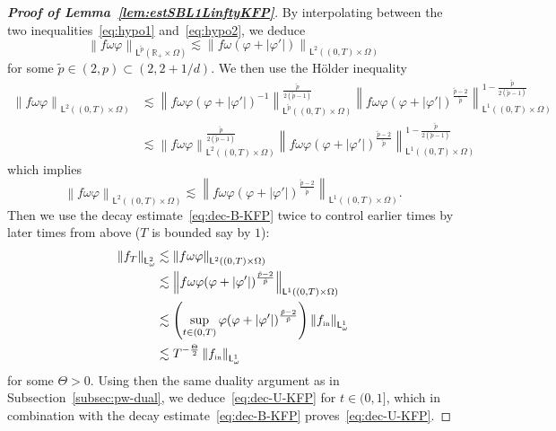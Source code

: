\documentclass[11pt]{amsart}
\theoremstyle{definition}
\theoremstyle{remark}
\numberwithin{equation}{section}
\newcommand\R{{\mathbb R}}
\newcommand{\init}{\text{{\tiny {\rm in}}}}
\newcommand{\sfL}{\mathsf{L}}
\begin{document}
\begin{proof}[{\bf Proof of Lemma~\ref{lem:estSBL1LinftyKFP}}]
By interpolating between the two inequalities~\eqref{eq:hypo1} and~\eqref{eq:hypo2}, we deduce
\begin{equation}
  \label{eq:hypo3}
  \left\| f \omega \varphi \right\|_{\sfL^{\tilde p}(\R_+ \times \Omega)}  \lesssim
  \left\| f \omega (\varphi + |\varphi'|) \right\|_{\sfL^2((0,T) \times \Omega)}
\end{equation}
for some $\tilde p \in (2,p) \subset (2,2+1/d)$. We then use the Hölder inequality
\begin{align*}
  \left\| f \omega \varphi \right\|_{\sfL^2((0,T) \times \Omega)}
  & \lesssim \left\| f \omega \varphi (\varphi + |\varphi'|)^{-1} \right\|_{\sfL^{\tilde p}((0,T) \times \Omega)} ^{\frac{\tilde p}{2(\tilde p-1)}}  \left\| f \omega \varphi (\varphi + |\varphi'|)^{\frac{\tilde p-2}{\tilde p}} \right\|_{\sfL^1((0,T) \times \Omega)} ^{1-\frac{\tilde p}{2(\tilde p-1)}} \\
  & \lesssim \left\| f \omega \varphi \right\|_{\sfL^2((0,T) \times \Omega)} ^{\frac{\tilde p}{2(\tilde p-1)}}  \left\| f \omega \varphi (\varphi + |\varphi'|)^{\frac{\tilde p-2}{\tilde p}} \right\|_{\sfL^1((0,T) \times \Omega)} ^{1-\frac{\tilde p}{2(\tilde p-1)}}
\end{align*}
which implies 
\begin{equation*}
  \left\| f \omega \varphi \right\|_{\sfL^2((0,T) \times \Omega)}
  \lesssim \left\| f \omega \varphi (\varphi + |\varphi'|)^{\frac{\tilde p-2}{\tilde p}} \right\|_{\sfL^1((0,T) \times \Omega)}.
\end{equation*}
Then we use the decay estimate~\eqref{eq:dec-B-KFP} twice to control earlier times by later times from above ($T$ is bounded say by $1$):
\begin{align*}
  \left\| f_T \right\|_{\sfL^2_\omega}
  & \lesssim  \left\| f \omega \varphi \right\|_{\sfL^2((0,T) \times \Omega)} \\
  & \lesssim \left\| f \omega \varphi (\varphi + |\varphi'|)^{\frac{\tilde p-2}{\tilde p}} \right\|_{\sfL^1((0,T) \times \Omega)} \\
  & \lesssim \left( \sup_{t \in (0,T)} \varphi (\varphi + |\varphi'|)^{\frac{\tilde p-2}{\tilde p}} \right) \left\| f_\init  \right\|_{\sfL^1_{\omega}} \\
  & \lesssim T^{-\frac{\Theta}{2}} \left\| f_\init \right\|_{\sfL^1_{\omega}}
\end{align*}
for some $\Theta >0$. Using then the same duality argument as in  Subsection~\ref{subsec:pw-dual}, we deduce~\eqref{eq:dec-U-KFP} for $t \in (0,1]$, which in combination with the decay estimate~\eqref{eq:dec-B-KFP} proves~\eqref{eq:dec-U-KFP}. 


\end{proof}
\end{document}
